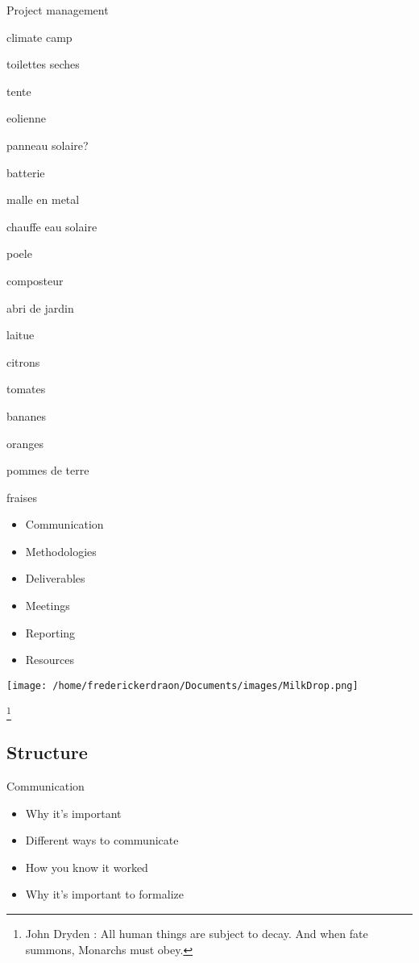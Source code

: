 \documentclass{beamer}
\begin{document}
\begin{frame}{Project management}
\begin{multicols}{2}
[
]
climate camp



toilettes seches

tente

eolienne

panneau solaire?

batterie

malle en metal

chauffe eau solaire

poele

composteur

abri de jardin



laitue

citrons

tomates

bananes

oranges

pommes de terre

fraises


 \begin{itemize}
  \item
   Communication 
  \item
   Methodologies 
  \item
   Deliverables 
  \item
   Meetings 
  \item
   Reporting 
  \item
   Resources 
 \end{itemize}
\texttt{[image: /home/frederickerdraon/Documents/images/MilkDrop.png]}
\end{multicols}
\footnote{
\tiny{John Dryden : All human things are subject to decay. And when fate summons, Monarchs must obey.}
}
\end{frame}

\subsection{Structure}

\begin{frame}{Communication}
 \begin{itemize}
  \item
    Why it's important 
  \item
    Different ways to communicate 
  \item
    How you know it worked 
  \item
    Why it's important to formalize 
 \end{itemize}
\end{frame}
\end{document}

